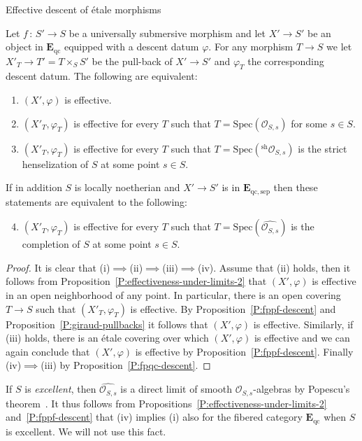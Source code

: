 \documentclass[a4paper,twoside,11pt]{amsart}[2009/07/02] %
\newcommand{\pref}[1]{\eqref{#1}}
\newcommand{\map}[3]{#1\,:\, #2\rightarrow #3}
\newcommand{\etale}{\'{e}tale}
\newcommand{\Spec}{\mathrm{Spec}}
\newcommand{\sep}{\mathrm{sep}}
\newcommand{\shensel}[1]{{^{\mathrm{sh}}{#1}}}
\newcommand\sO{\mathcal{O}} %
\newcommand{\catE}{\mathbf{E}}
\newcommand{\qc}{\mathrm{qc}}
\begin{document}
\begin{section}{Effective descent of \etale{} morphisms}
\begin{proposition}\label{P:locality-of-effectiveness}
Let $\map{f}{S'}{S}$ be a universally submersive morphism and let $X'\to S'$ be
an object in $\catE_{\qc}$ equipped with a descent datum $\varphi$. For
any morphism $T\to S$ we let $X'_T\to T'=T\times_S S'$ be the pull-back of
$X'\to S'$ and $\varphi_T$ the corresponding descent datum. The following
are equivalent:
%
\begin{enumerate}
\item $(X',\varphi)$ is effective.
\item $(X'_T,\varphi_T)$ is effective for every $T$ such that
$T=\Spec(\sO_{S,s})$ for some $s\in S$.
%
\item $(X'_T,\varphi_T)$ is effective for every $T$ such that
$T=\Spec(\shensel{\sO_{S,s}})$ is the strict henselization of $S$ at
some point $s\in S$.
%
\end{enumerate}
%
If in addition $S$ is locally noetherian and $X'\to S'$ is in
$\catE_{\qc,\sep}$ then these statements are equivalent to the following:
%
\begin{enumerate}\setcounter{enumi}{3}
\item $(X'_T,\varphi_T)$ is effective for every $T$ such that
$T=\Spec(\widehat{\sO_{S,s}})$ is the completion of $S$ at some point $s\in S$.
\end{enumerate}
%
\end{proposition}
\begin{proof}
It is clear that (i)$\implies$(ii)$\implies$(iii)$\implies$(iv). Assume that
(ii) holds, then it follows from
Proposition~\pref{P:effectiveness-under-limits-2} that $(X',\varphi)$ is
effective in an open neighborhood of any point. In particular, there is an open
covering $T\to S$ such that $(X'_T,\varphi_T)$ is effective. By
Proposition~\pref{P:fppf-descent} and Proposition~\pref{P:giraud-pullbacks} it
follows that $(X',\varphi)$ is effective. Similarly, if (iii) holds, there is
an \etale{} covering over which $(X',\varphi)$ is effective and we can again
conclude that $(X',\varphi)$ is effective by Proposition~\pref{P:fppf-descent}.
%
Finally (iv)$\implies$(iii) by Proposition~\pref{P:fpqc-descent}.
\end{proof}

\begin{remark}\label{R:popescu}
If $S$ is \emph{excellent}, then $\widehat{\sO_{S,s}}$ is a direct limit of
smooth $\sO_{S,s}$-algebras by Popescu's
theorem~\cite{swan_popescus_theorem,spivakovsky_popescus_theorem}. It thus
follows from Propositions~\pref{P:effectiveness-under-limits-2}
and~\pref{P:fppf-descent} that (iv) implies (i) also for the fibered category
$\catE_{\qc}$ when $S$ is excellent. We will not use this fact.
\end{remark}



\end{section}
\end{document}
